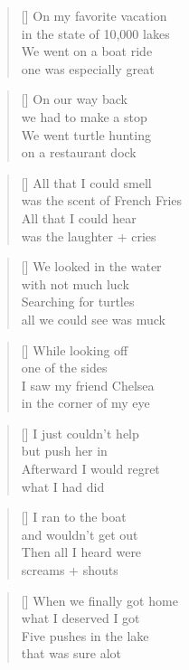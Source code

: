 \settowidth{\versewidth}{was the scent of French fries}
\begin{verse}[\versewidth]
On my favorite vacation\\
in the state of 10,000 lakes\\
We went on a boat ride\\
one was especially great\\
\end{verse}

\begin{verse}[\versewidth]
On our way back\\
we had to make a stop\\
We went turtle hunting\\
on a restaurant dock\\
\end{verse}

\begin{verse}[\versewidth]
All that I could smell\\
was the scent of French Fries\\
All that I could hear\\
was the laughter + cries\\
\end{verse}

\begin{verse}[\versewidth]
We looked in the water\\
with not much luck\\
Searching for turtles\\
all we could see was muck\\
\end{verse}

\begin{verse}[\versewidth]
While looking off\\
one of the sides\\
I saw my friend Chelsea\\
in the corner of my eye\\
\end{verse}

\begin{verse}[\versewidth]
I just couldn't help\\
but push her in\\
Afterward I would regret\\
what I had did\\
\end{verse}

\begin{verse}[\versewidth]
I ran to the boat\\
and wouldn't get out\\
Then all I heard were\\
screams + shouts\\
\end{verse}

\begin{verse}[\versewidth]
When we finally got home\\
what I deserved I got\\
Five pushes in the lake\\
that was sure alot\\
\end{verse}

